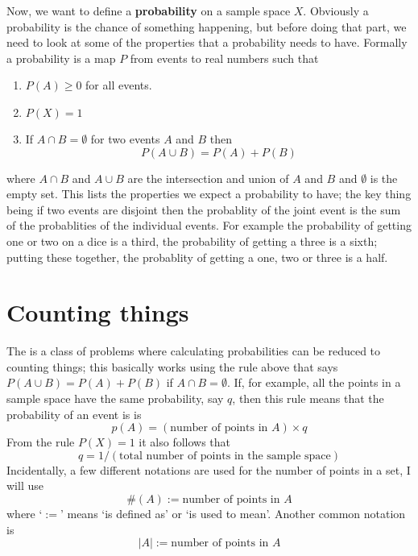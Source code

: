 \documentclass[11pt,a4paper]{scrartcl}
\begin{document}
Now, we want to define a \textbf{probability} on a sample space
$X$. Obviously a probability is the chance of something happening, but
before doing that part, we need to look at some of the properties that
a probability needs to have. Formally a probability is a map $P$ from
events to real numbers such that
\begin{enumerate}
\item $P(A)\ge 0$ for all events.
\item $P(X)=1$
\item If $A\cap B=\emptyset$ for two events $A$ and $B$ then 
\begin{equation}
P(A\cup B)=P(A)+P(B)
\end{equation}
\end{enumerate}
where $A\cap B$ and $A\cup B$ are the intersection and union of $A$
and $B$ and $\emptyset$ is the empty set. This lists the properties we
expect a probability to have; the key thing being if two events are
disjoint then the probablity of the joint event is the sum of the
probablities of the individual events. For example the probability of
getting one or two on a dice is a third, the probability of getting a
three is a sixth; putting these together, the probablity of getting a
one, two or three is a half.

\section{Counting things}

The is a class of problems where calculating probabilities can be
reduced to counting things; this basically works using the rule above
that says $P(A\cup B)=P(A)+P(B)$ if $A\cap B=\emptyset$. If, for
example, all the points in a sample space have the same probability, say $q$, then
this rule means that the probability of an event is is 
\begin{equation}
p(A)=(\mbox{number of points in }A)\times q
\end{equation}
From the rule $P(X)=1$ it also follows that 
\begin{equation}
q=1/(\mbox{total number of points in the sample space})
\end{equation}
Incidentally, a few different notations are used for the number of points in a set, I will use
\begin{equation}
\#(A):=\mbox{number of points in }A
\end{equation}
where \lq{}$:=$\rq{} means \lq{}is defined as\rq{} or \lq{}is used to
mean\rq{}. Another common notation is
\begin{equation}
|A|:=\mbox{number of points in }A
\end{equation}
\end{document}

